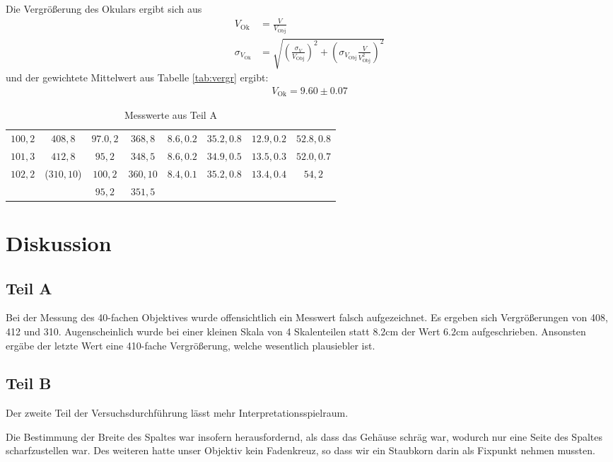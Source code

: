 \documentclass[12pt,a4paper,titlepage,headinclude,bibtotoc]{scrartcl}
\begin{document}
Die Vergrößerung des Okulars ergibt sich aus
\begin{align}
V_\text{Ok}&=\frac{V}{V_\text{Obj}}\\
\sigma_{V_\text{Ok}}&=\sqrt{\left(\frac{\sigma_V}{V_\text{Obj}}\right)^2+\left(\sigma_{V_\text{Obj}} \frac{V}{V_\text{Obj}^2} \right)^2}
\end{align}
und der gewichtete Mittelwert aus Tabelle \ref{tab:vergr} ergibt:
\begin{align}
V_\text{Ok}=9.60\pm0.07
\end{align}
\begin{table}
\centering
\begin{tabular}{|c|c|c|c|c|c|c|c|}

$ 100, 2 $	&$408,8$	&$ 97.0, 2 $	&$ 368, 8 $	&$ 8.6, 0.2 $	&$ 35.2, 0.8 $	&$ 12.9, 0.2 $	&$ 52.8, 0.8 $	\\
$ 101, 3 $	&$412,8$	&$ 95, 2 $	&$ 348, 5 $	&$ 8.6, 0.2 $	&$ 34.9, 0.5 $	&$ 13.5, 0.3 $	&$ 52.0, 0.7 $	\\
$ 102, 2 $	&($310,10$)	&$ 100, 2 $	&$ 360, 10 $	&$ 8.4, 0.1 $	&$ 35.2, 0.8 $	&$ 13.4, 0.4 $	&$ 54, 2 $	\\
		&	&$ 95, 2 $	&$ 351, 5 $	&		&		&		&		\\



\end{tabular}
\caption{Messwerte aus Teil A}
\label{tab:MesswerteA}
\end{table}

\section{Diskussion}
\label{sec:diskussion}
\subsection{Teil A}
Bei der Messung des 40-fachen Objektives wurde offensichtlich ein Messwert falsch aufgezeichnet.
Es ergeben sich Vergrößerungen von 408, 412 und 310.
Augenscheinlich wurde bei einer kleinen Skala von 4 Skalenteilen statt $8.2\si{\centi\metre}$ der Wert $6.2\si{\centi\metre}$ aufgeschrieben.
Ansonsten ergäbe der letzte Wert eine 410-fache Vergrößerung, welche wesentlich plausiebler ist.

\subsection{Teil B}
Der zweite Teil der Versuchsdurchführung lässt mehr Interpretationsspielraum.

Die Bestimmung der Breite des Spaltes war insofern herausfordernd, als dass das Gehäuse schräg war, wodurch nur eine Seite des Spaltes scharfzustellen war.
Des weiteren hatte unser Objektiv kein Fadenkreuz, so dass wir ein Staubkorn darin als Fixpunkt nehmen mussten.




\end{document}
